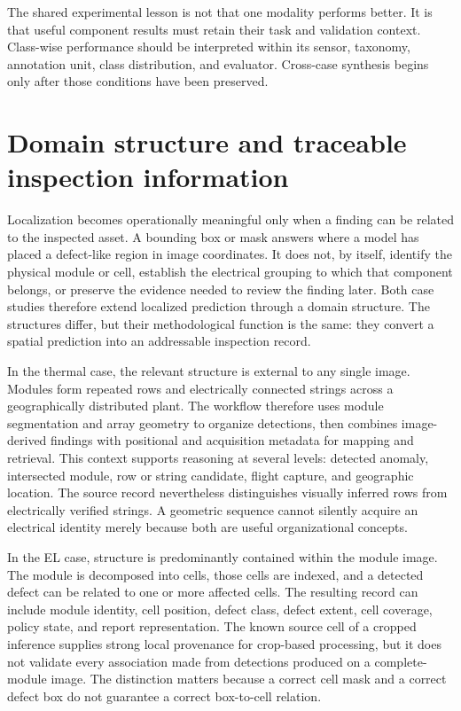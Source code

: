 \documentclass[12pt,a4paper]{report}
\begin{document}
The shared experimental lesson is not that one modality performs better. It is that useful component results must retain their task and validation context. Class-wise performance should be interpreted within its sensor, taxonomy, annotation unit, class distribution, and evaluator. Cross-case synthesis begins only after those conditions have been preserved.

\section{Domain structure and traceable inspection information}
\label{sec:ch07-domain-structure}

Localization becomes operationally meaningful only when a finding can be related to the inspected asset. A bounding box or mask answers where a model has placed a defect-like region in image coordinates. It does not, by itself, identify the physical module or cell, establish the electrical grouping to which that component belongs, or preserve the evidence needed to review the finding later. Both case studies therefore extend localized prediction through a domain structure. The structures differ, but their methodological function is the same: they convert a spatial prediction into an addressable inspection record.

In the thermal case, the relevant structure is external to any single image. Modules form repeated rows and electrically connected strings across a geographically distributed plant. The workflow therefore uses module segmentation and array geometry to organize detections, then combines image-derived findings with positional and acquisition metadata for mapping and retrieval. This context supports reasoning at several levels: detected anomaly, intersected module, row or string candidate, flight capture, and geographic location. The source record nevertheless distinguishes visually inferred rows from electrically verified strings. A geometric sequence cannot silently acquire an electrical identity merely because both are useful organizational concepts.

In the EL case, structure is predominantly contained within the module image. The module is decomposed into cells, those cells are indexed, and a detected defect can be related to one or more affected cells. The resulting record can include module identity, cell position, defect class, defect extent, cell coverage, policy state, and report representation. The known source cell of a cropped inference supplies strong local provenance for crop-based processing, but it does not validate every association made from detections produced on a complete-module image. The distinction matters because a correct cell mask and a correct defect box do not guarantee a correct box-to-cell relation.
\end{document}
